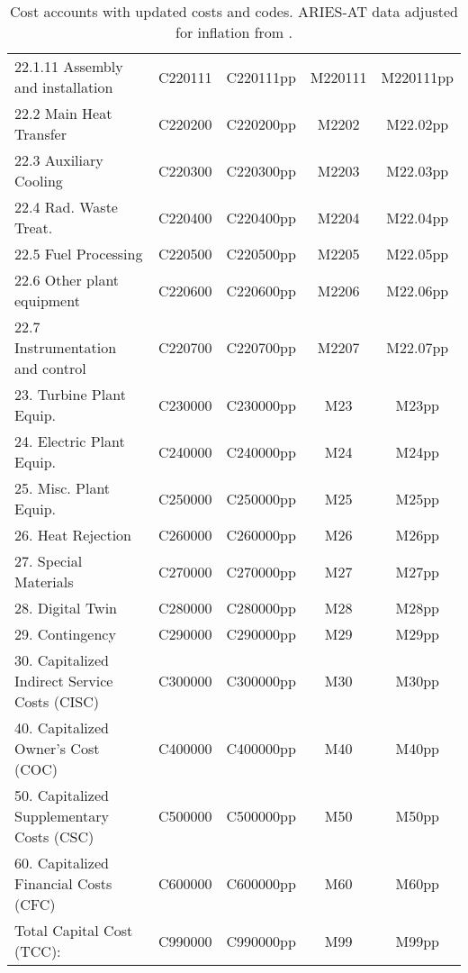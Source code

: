 \begin{table}[h!]
{\begin{tabular}{lcccc}
\hspace{15mm}22.1.11 Assembly and installation & C220111 & C220111pp & M220111 & M220111pp \\
\hspace{10mm}22.2 Main Heat Transfer & C220200 & C220200pp & M2202 & M22.02pp \\
\hspace{10mm}22.3 Auxiliary Cooling & C220300 & C220300pp & M2203 & M22.03pp \\
\hspace{10mm}22.4 Rad. Waste Treat. & C220400 & C220400pp & M2204 & M22.04pp \\
\hspace{10mm}22.5 Fuel Processing & C220500 & C220500pp & M2205 & M22.05pp \\
\hspace{10mm}22.6 Other plant equipment & C220600 & C220600pp & M2206 & M22.06pp \\
\hspace{10mm}22.7 Instrumentation and control & C220700 & C220700pp & M2207 & M22.07pp \\
\hspace{5mm}23. Turbine Plant Equip. & C230000 & C230000pp & M23 & M23pp \\
\hspace{5mm}24. Electric Plant Equip. & C240000 & C240000pp & M24 & M24pp \\
\hspace{5mm}25. Misc. Plant Equip. & C250000 & C250000pp & M25 & M25pp \\
\hspace{5mm}26. Heat Rejection & C260000 & C260000pp & M26 & M26pp \\
\hspace{5mm}27. Special Materials & C270000 & C270000pp & M27 & M27pp \\
\hspace{5mm}28. Digital Twin & C280000 & C280000pp & M28 & M28pp \\
\hspace{5mm}29. Contingency & C290000 & C290000pp & M29 & M29pp \\
30. Capitalized Indirect Service Costs (CISC) & C300000 & C300000pp & M30 & M30pp \\
40. Capitalized Owner’s Cost (COC) & C400000 & C400000pp & M40 & M40pp \\
50. Capitalized Supplementary Costs (CSC) & C500000 & C500000pp & M50 & M50pp \\
60. Capitalized Financial Costs (CFC) & C600000 & C600000pp & M60 & M60pp \\
\hline
Total Capital Cost (TCC): & C990000 & C990000pp & M99 & M99pp \\
\hline
\end{tabular}
}
\caption{Cost accounts with updated costs and codes. ARIES-AT data adjusted for inflation from \cite{gordon1986mirror}.}
\label{tab:costs_updated_codes}
\end{table}


